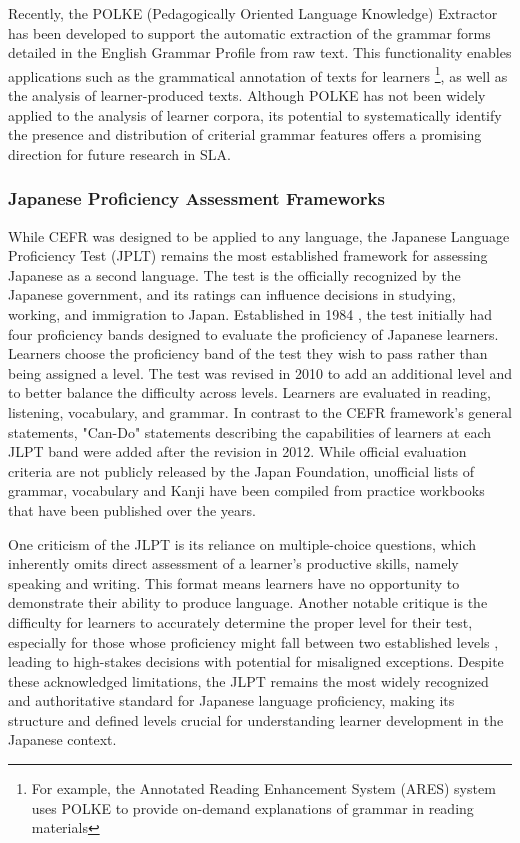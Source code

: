 Recently, the POLKE (Pedagogically Oriented Language Knowledge) Extractor
\citep{POLKE} has been developed to support the automatic extraction of the grammar forms detailed in the English
Grammar
Profile from raw text. This functionality enables applications such as the grammatical annotation of texts for
learners
\footnote{For example, the Annotated Reading Enhancement System (ARES) \citep{lee2024} system uses POLKE to provide on-demand explanations of grammar in reading materials}, as well as the analysis of learner-produced texts. Although POLKE has not been widely applied to the analysis of learner corpora, its potential to systematically identify the presence and distribution of criterial grammar features offers a promising direction for future research in SLA.

\subsubsection{Japanese Proficiency Assessment Frameworks}
While CEFR was designed to be applied to any language, the Japanese Language Proficiency Test (JPLT) remains the
most established framework for assessing Japanese as a second language. The test is the officially
recognized by the Japanese government, and its ratings can influence decisions in studying, working, and immigration to
Japan.  
Established in
1984
\citet{JLPTinfo}, the
test initially had four
proficiency bands
designed to evaluate the proficiency of Japanese learners. Learners choose the proficiency band of the test they
wish to pass rather than being assigned a level. The test was revised in 2010 to add an additional level and to
better balance the difficulty across levels. Learners are evaluated in reading, listening,
vocabulary, and grammar. In contrast to the CEFR framework's general statements,
"Can-Do" statements describing the
capabilities of
learners at
each
JLPT band were added after the revision in 2012. While official evaluation criteria are not publicly released by the
Japan
Foundation,
unofficial lists of grammar, vocabulary and Kanji have been compiled from practice workbooks that
have been published over the years.

One criticism of the JLPT is its reliance on multiple-choice questions, which inherently omits direct assessment of
a learner's productive skills, namely speaking and writing\citet{JLPTcriticism}. This format means learners have
no opportunity to demonstrate their ability to produce language. Another notable critique is the difficulty for
learners to accurately determine the proper level for their test, especially for those whose proficiency might fall
between two established levels \citep{JLPTcriticism}, leading to high-stakes decisions with potential for misaligned
exceptions. Despite these acknowledged limitations, the JLPT remains the most widely
recognized and authoritative standard for Japanese language proficiency, making its structure and defined levels
crucial for understanding learner development in the Japanese context.

